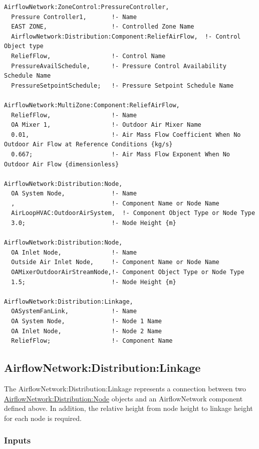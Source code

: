 \begin{lstlisting}
AirflowNetwork:ZoneControl:PressureController,
  Pressure Controller1,       !- Name
  EAST ZONE,                  !- Controlled Zone Name
  AirflowNetwork:Distribution:Component:ReliefAirFlow,  !- Control Object type
  ReliefFlow,                 !- Control Name
  PressureAvailSchedule,      !- Pressure Control Availability Schedule Name
  PressureSetpointSchedule;   !- Pressure Setpoint Schedule Name

AirflowNetwork:MultiZone:Component:ReliefAirFlow,
  ReliefFlow,                 !- Name
  OA Mixer 1,                 !- Outdoor Air Mixer Name
  0.01,                       !- Air Mass Flow Coefficient When No Outdoor Air Flow at Reference Conditions {kg/s}
  0.667;                      !- Air Mass Flow Exponent When No Outdoor Air Flow {dimensionless}

AirflowNetwork:Distribution:Node,
  OA System Node,             !- Name
  ,                           !- Component Name or Node Name
  AirLoopHVAC:OutdoorAirSystem,  !- Component Object Type or Node Type
  3.0;                        !- Node Height {m}

AirflowNetwork:Distribution:Node,
  OA Inlet Node,              !- Name
  Outside Air Inlet Node,     !- Component Name or Node Name
  OAMixerOutdoorAirStreamNode,!- Component Object Type or Node Type
  1.5;                        !- Node Height {m}

AirflowNetwork:Distribution:Linkage,
  OASystemFanLink,            !- Name
  OA System Node,             !- Node 1 Name
  OA Inlet Node,              !- Node 2 Name
  ReliefFlow;                 !- Component Name
\end{lstlisting}

\subsection{AirflowNetwork:Distribution:Linkage}\label{airflownetworkdistributionlinkage}

The AirflowNetwork:Distribution:Linkage represents a connection between two \hyperref[airflownetworkdistributionnode]{AirflowNetwork:Distribution:Node} objects and an AirflowNetwork component defined above. In addition, the relative height from node height to linkage height for each node is required.

\subsubsection{Inputs}\label{inputs-21}

